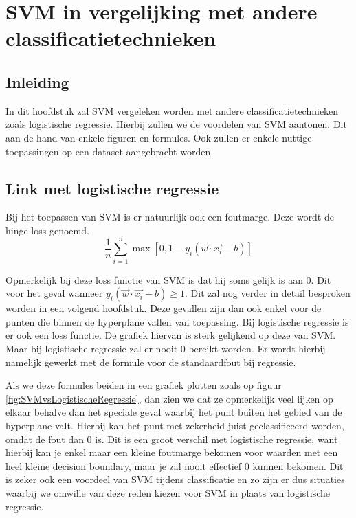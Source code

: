 \documentclass[TeamE-eindrapport]{subfiles}
\begin{document}
	\chapter{SVM in vergelijking met andere classificatietechnieken}
	
	\section{Inleiding}
	In dit hoofdstuk zal SVM vergeleken worden met andere classificatietechnieken zoals logistische regressie. Hierbij zullen we de voordelen van SVM aantonen. Dit aan de hand van enkele figuren en formules. Ook zullen er enkele nuttige toepassingen op een dataset aangebracht worden.  
	\section{Link met logistische regressie}
	Bij het toepassen van SVM is er natuurlijk ook een foutmarge. Deze wordt de hinge loss genoemd. 
	\[\frac{1}{n}\sum_{i=1}^{n}\max[0,1-y_i(\vec{w}\cdot{\vec{x_i}} - b)]\]

	Opmerkelijk bij deze loss functie van SVM is dat hij soms gelijk is aan 0. Dit voor het geval wanneer \(y_i(\vec{w}\cdot{\vec{x_i}} - b)\geq 1\). Dit zal nog verder in detail besproken worden in een volgend hoofdstuk. Deze gevallen zijn dan ook enkel voor de punten die binnen de hyperplane vallen van toepassing. Bij logistische regressie is er ook een loss functie. De grafiek hiervan is sterk gelijkend op deze van SVM. Maar bij logistische regressie zal er nooit 0 bereikt worden. Er wordt hierbij namelijk gewerkt met de formule voor de standaardfout bij regressie. 
	
	Als we deze formules beiden in een grafiek plotten zoals op figuur \ref{fig:SVMvsLogistischeRegressie}, dan zien we dat ze opmerkelijk veel lijken op elkaar behalve dan het speciale geval waarbij het punt buiten het gebied van de hyperplane valt. Hierbij kan het punt met zekerheid juist geclassificeerd worden, omdat de fout dan 0 is. Dit is een groot verschil met logistische regressie, want hierbij kan je enkel maar een kleine foutmarge bekomen voor waarden met een heel kleine decision boundary, maar je zal nooit effectief 0 kunnen bekomen. Dit is zeker ook een voordeel van SVM tijdens classificatie en zo zijn er dus situaties waarbij we omwille van deze reden kiezen voor SVM in plaats van logistische regressie. 
	
\end{document}
